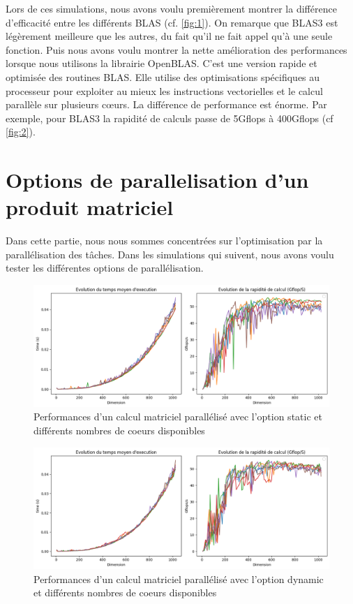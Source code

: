 \documentclass{report}
\begin{document}
Lors de ces simulations, nous avons voulu premièrement montrer la différence d'efficacité entre les différents BLAS (cf. \ref{fig:1}). On remarque que BLAS3 est légèrement meilleure que les autres, du fait qu'il ne fait appel qu'à une seule fonction.
Puis nous avons voulu montrer la nette amélioration des performances lorsque nous utilisons la librairie OpenBLAS. C'est une version rapide et optimisée des routines BLAS. Elle utilise des optimisations spécifiques au processeur pour exploiter au mieux les instructions vectorielles et le calcul parallèle sur plusieurs cœurs. La différence de performance est énorme. Par exemple, pour BLAS3 la rapidité de calculs passe de 5Gflops à 400Gflops (cf \ref{fig:2}).

\chapter{Options de parallelisation d'un produit matriciel}

Dans cette partie, nous nous sommes concentrées sur l'optimisation par la parallélisation des tâches. Dans les simulations qui suivent, nous avons voulu tester les différentes options de parallélisation.

\begin{figure}[H]
    \centering
    \includegraphics[width=0.7\linewidth]{images/fig4.png}
    \caption{Performances d'un calcul matriciel parallélisé avec l'option static et différents nombres de coeurs disponibles}
    \label{fig:4}
\end{figure}

\begin{figure}[H]
    \centering
    \includegraphics[width=0.7\linewidth]{images/fig5.png}
    \caption{Performances d'un calcul matriciel parallélisé avec l'option dynamic et différents nombres de coeurs disponibles}
    \label{fig:5}
\end{figure}
\end{document}
